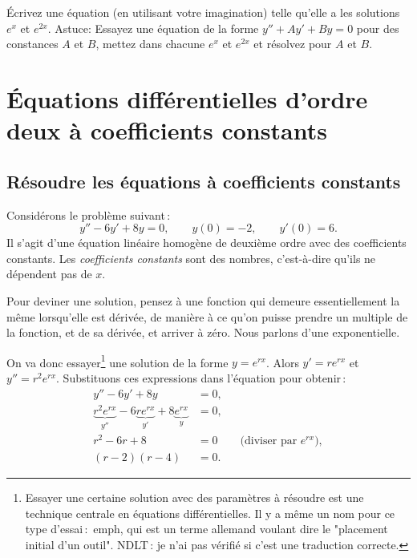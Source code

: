 \begin{exercise}
Écrivez une équation (en utilisant votre imagination) telle qu'elle a les solutions 
$e^x$ et $e^{2x}$.  Astuce: Essayez une équation de la forme 
$y''+Ay'+By = 0$ pour des constances $A$ et $B$,
mettez dans chacune $e^x$ et $e^{2x}$ et résolvez pour $A$ et $B$.
\end{exercise}



\sectionnewpage
\section[EDO d'ordre 2 à coefficients constants]{Équations différentielles d'ordre deux à coefficients constants}
\label{sec:ccsol}





\subsection{Résoudre les équations à coefficients constants}

Considérons le problème suivant\,: 
\begin{equation*}
y''-6y'+8y = 0, \qquad y(0) = - 2, \qquad y'(0) = 6 .
\end{equation*}
Il s'agit d'une équation linéaire homogène de deuxième ordre avec des coefficients constants. Les  \emph{coefficients constants }
sont des nombres, c'est-à-dire qu'ils ne dépendent pas de $x$.  

Pour deviner une solution, pensez à une fonction qui demeure essentiellement la même lorsqu'elle est dérivée, de manière à ce qu'on puisse prendre un multiple de la fonction, et de sa dérivée,  et arriver à zéro.  Nous parlons d'une exponentielle. 

On va donc essayer\footnote{%
Essayer une certaine solution avec des paramètres à résoudre est une technique centrale en équations différentielles.  Il y a même un nom pour ce type d'essai\,:\ emph{}, qui est un terme allemand voulant dire le  "placement initial d'un outil".  NDLT\,: je n'ai pas vérifié si c'est une traduction correcte.} une solution de la forme $y = e^{rx}$.  Alors $y' = r e^{rx}$ et
$y'' = r^2 e^{rx}$.  Substituons ces expressions dans l'équation pour obtenir\,: 
\begin{align*}
y''-6y'+8y & = 0 , \\
\underbrace{r^2 e^{rx}}_{y''} -6 \underbrace{r e^{rx}}_{y'}+8 \underbrace{e^{rx}}_{y} & = 0 , \\
r^2 -6 r +8 & = 0 \qquad \text{(diviser par } e^{rx} \text{)},\\
(r-2)(r-4) & = 0 .
\end{align*}

